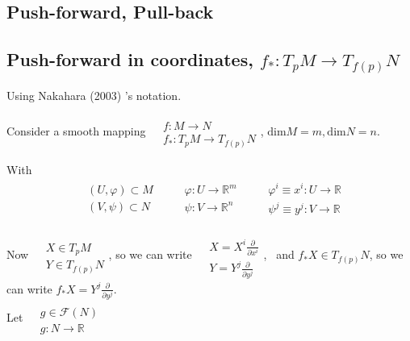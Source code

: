 \documentclass[10pt]{amsart}
\begin{document}
\begin{multicols*}{2}
\section{Push-forward, Pull-back}

\subsection{Push-forward in coordinates, $f_*  : T_p M \to T_{f(p)}N$}

Using Nakahara (2003) \cite{Naka2003}'s notation.

Consider a smooth mapping $\begin{aligned} & \quad \\ 
		& f : M \to N \\
		& f_* : T_p M \to T_{f(p)}N \end{aligned}$, $\text{dim}M = m, \text{dim}N = n$.
	
With
\[
\begin{gathered}
\begin{aligned}
	& (U, \varphi) \subset M \\
	& (V, \psi) \subset N
\end{aligned} \quad \, \begin{aligned}
& \varphi: U \to \mathbb{R}^m \\
& \psi: V \to \mathbb{R}^n 
\end{aligned} \quad \, \begin{aligned}
& \varphi^i \equiv x^i : U \to \mathbb{R} \\ 
& \psi^j \equiv y^j : V \to \mathbb{R} 
\end{aligned}
\end{gathered}
\]

Now $\begin{aligned} & \quad \\ 
	& X \in T_p M \\ 
	& Y \in T_{f(p)} N \end{aligned}$, so we can write $\begin{aligned} & \quad \\ 
	& X = X^i \frac{\partial }{ \partial x^i} \\ 
	& Y = Y^j \frac{ \partial }{ \partial y^j } \end{aligned}$, \, and $f_* X \in T_{f(p)}N$, so we can write $f_* X = Y^j \frac{\partial }{ \partial y^j}$. \\

Let $\begin{aligned} & \quad \\ 
	 & g\in \mathcal{F}(N) \\
	 & g: N \to \mathbb{R} \end{aligned}$ \\
 

\end{multicols*}
\end{document}
